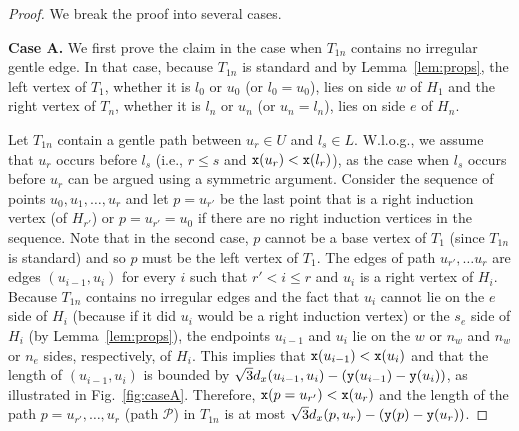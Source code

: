 \begin{proof}%
We break the proof into several cases.

{\bf Case A.}
We first prove the claim in the case when $T_{1n}$ contains no irregular gentle
edge. In that case, because $T_{1n}$ is standard and by Lemma~\ref{lem:props},
the left vertex of $T_1$, whether it is $l_{0}$ or $u_{0}$ (or $l_0=u_0$),
lies on side $w$ of $H_1$ and the right vertex of $T_n$, whether it is $l_n$
or $u_n$ (or $u_n=l_n$), lies on side $e$ of $H_n$.

Let $T_{1n}$ contain a gentle path between $u_r \in U$ and
$l_s \in L$. W.l.o.g., we assume that $u_r$ occurs before $l_s$ 
(i.e., $r \leq s$ and ${\tt x}(u_r) < {\tt x}(l_r)$), 
as the case when $l_s$ occurs before $u_r$ can be argued
using a symmetric argument. 
Consider the sequence of points $u_{0}, u_1, \dots, u_r$ and
let $p=u_{r'}$ be the last point that is a right induction vertex (of $H_{r'}$)
or $p=u_{r'}=u_{0}$ if there are no right induction vertices in the sequence.
Note that in the second case, $p$ cannot be a base vertex of $T_1$ 
(since $T_{1n}$ is standard) and so $p$ must be the left vertex of
$T_1$.
The edges of path $u_{r'}, \dots u_r$ are edges $(u_{i-1},u_i)$ for every $i$
such that $r' < i \leq r$ and $u_i$ is a right vertex of $H_i$. Because $T_{1n}$
contains no irregular edges and the fact that $u_i$ cannot lie on the $e$ side
of $H_i$ (because if it did $u_i$ would be a right induction vertex) or
the $s_e$ side of $H_i$ (by Lemma~\ref{lem:props}), the endpoints $u_{i-1}$ 
and $u_i$ lie on the $w$ or $n_w$
and $n_w$ or $n_e$ sides, respectively, of $H_i$. This implies that
${\tt x}(u_{i-1}) < {\tt x}(u_i)$ and that the length of $(u_{i-1},u_i)$ is
bounded by
$\sqrt{3}d_x(u_{i-1},u_i) - ({\tt y}(u_{i-1})-{\tt y}(u_i))$, as illustrated in 
Fig.~\ref{fig:caseA}. %
Therefore, ${\tt x}(p=u_{r'}) < {\tt x}(u_r)$ and the length of the path 
$p=u_{r'}, \dots, u_r$ (path $\mathcal{P}$)
in $T_{1n}$ is at most $\sqrt{3}d_x(p,u_{r})-({\tt y}(p)-{\tt y}(u_r))$. 


\end{proof}
